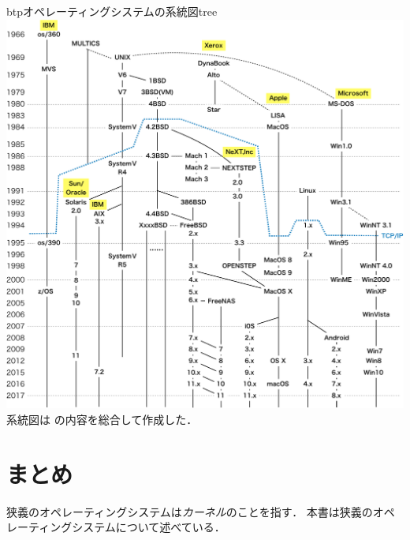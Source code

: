 \begin{myfig}{btp}{オペレーティングシステムの系統図}{tree}
  \includegraphics[scale=0.6]{Fig/tree-crop.pdf}\\
                  {\small
                    系統図は\cite{os360,
                      mvs,
                      os390,
                      zos,
                      unix,
                      solaris,
                      aix,
                      mach,
                      bsd,
                      bsdd,
                      386bsd,
                      freebsd,
                      freenas,
                      nextstep,
                      classicmacos,
                      dynabook,
                      macos,
                      ios,
                      linux,
                      android,
                      msdos,
                      windows}
                    の内容を総合して作成した．}
\end{myfig}

\section{まとめ}
狭義のオペレーティングシステムは\emph{カーネル}のことを指す．
本書は狭義のオペレーティングシステムについて述べている．

